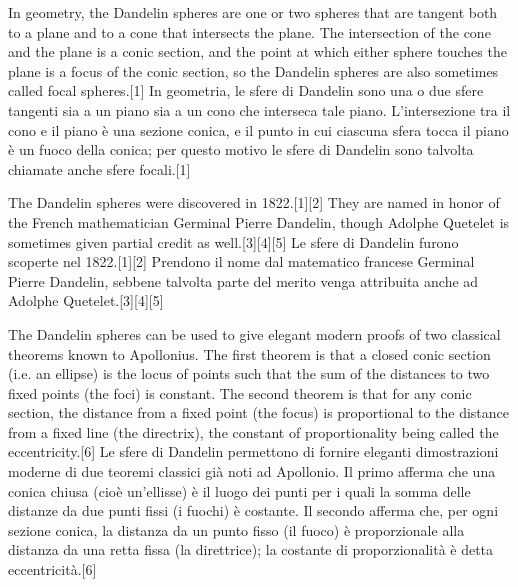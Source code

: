
In geometry, the Dandelin spheres are one or two spheres that are tangent both to a plane and to a cone that intersects the plane. The intersection of the cone and the plane is a conic section, and the point at which either sphere touches the plane is a focus of the conic section, so the Dandelin spheres are also sometimes called focal spheres.[1] %
In geometria, le sfere di Dandelin sono una o due sfere tangenti sia a un piano sia a un cono che interseca tale piano. L'intersezione tra il cono e il piano è una sezione conica, e il punto in cui ciascuna sfera tocca il piano è un fuoco della conica; per questo motivo le sfere di Dandelin sono talvolta chiamate anche sfere focali.[1] %

The Dandelin spheres were discovered in 1822.[1][2] They are named in honor of the French mathematician Germinal Pierre Dandelin, though Adolphe Quetelet is sometimes given partial credit as well.[3][4][5] %
Le sfere di Dandelin furono scoperte nel 1822.[1][2] Prendono il nome dal matematico francese Germinal Pierre Dandelin, sebbene talvolta parte del merito venga attribuita anche ad Adolphe Quetelet.[3][4][5] %

The Dandelin spheres can be used to give elegant modern proofs of two classical theorems known to Apollonius. The first theorem is that a closed conic section (i.e. an ellipse) is the locus of points such that the sum of the distances to two fixed points (the foci) is constant. The second theorem is that for any conic section, the distance from a fixed point (the focus) is proportional to the distance from a fixed line (the directrix), the constant of proportionality being called the eccentricity.[6] %
Le sfere di Dandelin permettono di fornire eleganti dimostrazioni moderne di due teoremi classici già noti ad Apollonio. Il primo afferma che una conica chiusa (cioè un'ellisse) è il luogo dei punti per i quali la somma delle distanze da due punti fissi (i fuochi) è costante. Il secondo afferma che, per ogni sezione conica, la distanza da un punto fisso (il fuoco) è proporzionale alla distanza da una retta fissa (la direttrice); la costante di proporzionalità è detta eccentricità.[6] %



%